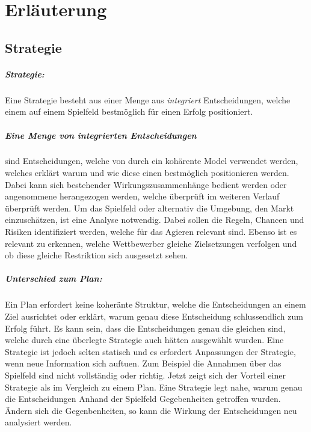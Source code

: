 \pagebreak
\chapter{Erläuterung}

\section{Strategie} \label{Appendix_Erlaeuterung_Strategie}

\paragraph{Strategie:}
Eine Strategie besteht aus einer Menge aus \textit{integriert} Entscheidungen, welche einem auf einem Spielfeld bestmöglich für einen Erfolg positioniert.\\

\paragraph{Eine Menge von integrierten Entscheidungen} sind Entscheidungen, welche von durch ein kohärente Model verwendet werden, welches erklärt warum und wie diese einen bestmöglich positionieren werden. Dabei kann sich bestehender Wirkungszusammenhänge bedient werden oder angenommene herangezogen werden, welche überprüft im weiteren Verlauf überprüft werden. Um das Spielfeld oder alternativ die Umgebung, den Markt einzuschätzen, ist eine Analyse notwendig. Dabei sollen die Regeln, Chancen und Risiken identifiziert werden, welche für das Agieren relevant sind. Ebenso ist es relevant zu erkennen, welche Wettbewerber gleiche Zielsetzungen verfolgen und ob diese gleiche Restriktion sich ausgesetzt sehen.\\

\paragraph{Unterschied zum Plan:} Ein Plan erfordert keine koheränte Struktur, welche die Entscheidungen an einem Ziel ausrichtet oder erklärt, warum genau diese Entscheidung schlussendlich zum Erfolg führt. Es kann sein, dass die Entscheidungen genau die gleichen sind, welche durch eine überlegte Strategie auch hätten ausgewählt wurden. Eine Strategie ist jedoch selten statisch und es erfordert Anpassungen der Strategie, wenn neue Information sich auftuen. Zum Beispiel die Annahmen über das Spielfeld sind nicht vollständig oder richtig. Jetzt zeigt sich der Vorteil einer Strategie als im Vergleich zu einem Plan. Eine Strategie legt nahe, warum genau die Entscheidungen Anhand der Spielfeld Gegebenheiten getroffen wurden. Ändern sich die Gegenbenheiten, so kann die Wirkung der Entscheidungen neu analysiert werden.


